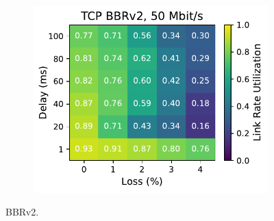 \begin{figure}[ht]
\begin{subfigure}[b]{0.89cm}
        \includegraphics[width=\linewidth,trim={8cm 0 0 0},clip]{splitting-paper/figures/heatmaps/heatmap_tcp_bbr2_50mbps.pdf}
        \vspace*{0.2cm}
    \end{subfigure}
    \caption{BBRv2.}
\end{figure}

